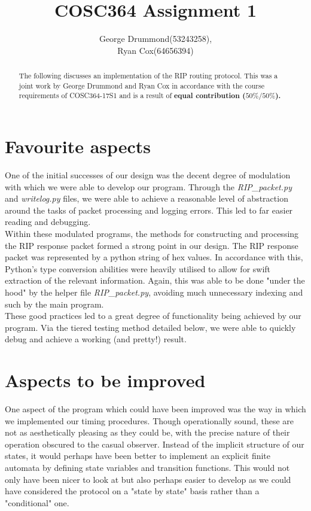 \documentclass[12pt,twoside]{article}
\begin{document}
\title{COSC364 Assignment 1}
\author{George Drummond(53243258), \\Ryan Cox(64656394)}
\maketitle
\thispagestyle{empty}

\begin{abstract}
The following discusses an implementation of the RIP routing protocol.
This was a joint work by George Drummond and Ryan Cox in accordance with the course requirements of COSC364-17S1 and is a result of \bf{equal} contribution ($50\% / 50\%$).
\end{abstract}

\tableofcontents

\section{ Favourite aspects}

One of the initial successes of our design was the decent degree of modulation with which we were able to develop our program. Through the \textit{RIP\_packet.py} and \textit{writelog.py} files, we were able to achieve a reasonable level of abstraction around the tasks of packet processing and logging errors. This led to far easier reading and debugging.\\

Within these modulated programs, the methods for constructing and processing the RIP response packet formed a strong point in our design. The RIP response packet was represented by a python string of hex values. In accordance with this, Python's type conversion abilities were heavily utilised to allow for swift extraction of the relevant information. Again, this was able to be done "under the hood" by the helper file \textit{RIP\_packet.py}, avoiding much unnecessary indexing and such by the main program.\\

These good practices led to a great degree of functionality being achieved by our program. Via the tiered testing method detailed below, we were able to quickly debug and achieve a working (and pretty!) result.

\section{Aspects to be improved}

One aspect of the program which could have been improved was the way in which we implemented our timing procedures. Though operationally sound, these are not as aesthetically pleasing as they could be, with the precise nature of their operation obscured to the casual observer. Instead of the implicit structure of our states, it would perhaps have been better to implement an explicit finite automata by defining state variables and transition functions. This would not only have been nicer to look at but also perhaps easier to develop as we could have considered the protocol on a "state by state" basis rather than a "conditional" one.
\end{document}
